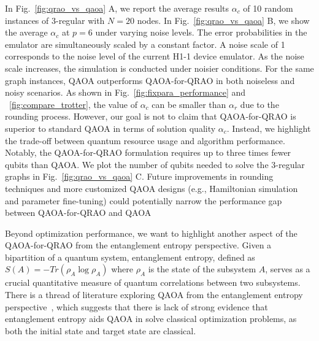 \documentclass[conference,10pt]{IEEEtran}
\newcommand{\QAOAQRAO}{QAOA-for-QRAO}
\begin{document}
In Fig.~\ref{fig:qrao_vs_qaoa} A, we report the average results $\alpha_c$ of 10 random instances of 3-regular with $N=20$ nodes. In Fig.~\ref{fig:qrao_vs_qaoa} B, we show the average $\alpha_c$ at $p=6$ under varying noise levels. The error probabilities in the emulator are simultaneously scaled by a constant factor. A noise scale of 1 corresponds to the noise level of the current H1-1 device emulator. As the noise scale increases, the simulation is conducted under noisier conditions. For the same graph instances, QAOA outperforms \QAOAQRAO{} in both noiseless and noisy scenarios. As shown in Fig.~\ref{fig:fixpara_performance} and ~\ref{fig:compare_trotter}, the value of $\alpha_c$ can be smaller than $\alpha_r$ due to the rounding process. 
However, our goal is not to claim that \QAOAQRAO{} is superior to standard QAOA in terms of solution quality $\alpha_c$. Instead, we highlight the trade-off between quantum resource usage and algorithm performance. Notably, the \QAOAQRAO{} formulation requires up to three times fewer qubits than QAOA. We plot the number of qubits needed to solve the 3-regular graphs in Fig.~\ref{fig:qrao_vs_qaoa} C. Future improvements in rounding techniques and more customized QAOA designs (e.g., Hamiltonian simulation and parameter fine-tuning) could potentially narrow the performance gap between \QAOAQRAO{} and QAOA

Beyond optimization performance, we want to highlight another aspect of the \QAOAQRAO{} from the entanglement entropy perspective. 
Given a bipartition of a quantum system, entanglement entropy, defined as $S(A)=-Tr(\rho_A \log \rho_A)$ where $\rho_A$ is the state of the subsystem $A$, serves as a crucial quantitative measure of quantum correlations between two subsystems. There is a thread of literature exploring QAOA from the entanglement entropy perspective~\cite{chen2022much,sreedhar2022quantum,dupont2022entanglement}, which suggests that there is lack of strong evidence that entanglement entropy aids QAOA in solve classical optimization problems, as both the initial state and target state are classical. 
\end{document}
